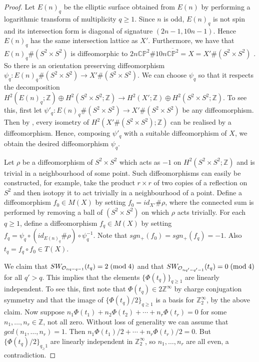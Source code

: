 \documentclass{amsart}
\theoremstyle{definition}
\theoremstyle{remark}
\numberwithin{equation}{section}
\begin{document}
\begin{proof}
Let $E(n)_q$ be the elliptic surface obtained from $E(n)$ by performing a logarithmic transform of multiplicity $q \ge 1$. Since $n$ is odd, $E(n)_q$ is not spin and its intersection form is diagonal of signature $(2n-1 , 10n-1)$. Hence $E(n)_q$ has the same intersection lattice as $X'$. Furthermore, we have that $E(n)_q \# (S^2 \times S^2)$ is diffeomorphic to $2n \mathbb{CP}^2 \# 10n \overline{\mathbb{CP}^2} = X = X' \# (S^2 \times S^2)$ \cite[Page 320]{gs}. So there is an orientation preserving diffeomorphism $\psi_q : E(n)_q \# (S^2 \times S^2) \to X' \# (S^2 \times S^2)$. We can choose $\psi_q$ so that it respects the decomposition $H^2( E(n)_q ; \mathbb{Z}) \oplus H^2(S^2 \times S^2 ; \mathbb{Z}) \to H^2( X' ; \mathbb{Z}) \oplus H^2(S^2 \times S^2 ; \mathbb{Z})$. To see this, first let $\psi'_q : E(n)_q \# (S^2 \times S^2) \to X' \# (S^2 \times S^2)$ be any diffeomorphism. Then by \cite{wall}, every isometry of $H^2(X' \# (S^2 \times S^2) ; \mathbb{Z})$ can be realised by a diffeomorphism. Hence, composing $\psi'_q$ with a suitable diffeomorphism of $X$, we obtain the desired diffeomorphism $\psi_q$.

Let $\rho$ be a diffeomorphism of $S^2 \times S^2$ which acts as $-1$ on $H^2(S^2 \times S^2 ; \mathbb{Z})$ and is trivial in a neighbourhood of some point. Such diffeomorphisms can easily be constructed, for example, take the product $r \times r$ of two copies of a reflection on $S^2$ and then isotopy it to act trivially in a neighbourhood of a point. Define a diffeomorphism $f_0 \in M(X)$ by setting $f_ 0 = id_{X'} \# \rho$, where the connected sum is performed by removing a ball of $(S^2 \times S^2)$ on which $\rho$ acts trivially. For each $q \ge 1$, define a diffeomorphism $f_q \in M(X)$ by setting $f_q = \psi_q \circ ( id_{E(n)_q} \# \rho ) \circ \psi_q^{-1}$. Note that $sgn_+(f_0) = sgn_+(f_q) = -1$. Also $t_q = f_q \circ f_0 \in T(X)$.

We claim that $SW_{\mathcal{O}_{nq-q-1}}(t_q) = 2 \; ({\rm mod} \; 4)$ and that $SW_{\mathcal{O}_{nq'-q'-1}}(t_{q}) = 0 \; ({\rm mod} \; 4)$ for all $q' > q$. This implies that the elements $\{ \Phi(t_q) \}_{q \ge 1}$ are linearly independent. To see this, first note that $\Phi(t_q) \in 2\mathbb{Z}^{\infty}$ by charge conjugation symmetry and that the image of $\{ \Phi(t_q)/2 \}_{q \ge 1}$ is a basis for $\mathbb{Z}_2^\infty$, by the above claim. Now suppose $n_1 \Phi(t_1) + n_2 \Phi(t_2) + \cdots + n_r \Phi(t_r) = 0$ for some $n_1, \dots , n_r \in \mathbb{Z}$, not all zero. Without loss of generality we can assume that $gcd(n_1, \dots , n_r) = 1$. Then $n_1 \Phi(t_1)/2 + \cdots + n_r \Phi(t_r)/2 = 0$. But $\{ \Phi(t_q)/2\}_{q_ \ge 1}$ are linearly independent in $\mathbb{Z}_2^\infty$, so $n_1, \dots , n_r$ are all even, a contradiction.


\end{proof}
\end{document}
